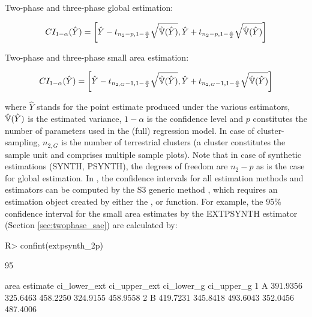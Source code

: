 Two-phase and three-phase global estimation:

\begin{equation}\label{ci_2phase_global}
CI_{1-\alpha}(\hat{Y})=\bigg{\lbrack}\hat{Y}-t_{n_{2}-p, 1-\frac{\alpha}{2}}\sqrt{\hat{\mathbb{V}}(\hat{Y})},
                              \hat{Y}+t_{n_{2}-p, 1-\frac{\alpha}{2}}\sqrt{\hat{\mathbb{V}}(\hat{Y})}\bigg{\rbrack}
\end{equation}

Two-phase and three-phase small area estimation:

\begin{equation}\label{ci_2phase_sae}
CI_{1-\alpha}(\hat{Y})=\bigg{\lbrack}\hat{Y}-t_{n_{2,G}-1, 1-\frac{\alpha}{2}}\sqrt{\hat{\mathbb{V}}(\hat{Y})},
                              \hat{Y}+t_{n_{2,G}-1, 1-\frac{\alpha}{2}}\sqrt{\hat{\mathbb{V}}(\hat{Y})}\bigg{\rbrack}
\end{equation}

\vspace{4mm}

where $\hat{Y}$ stands for the point estimate produced under the various estimators, $\hat{\mathbb{V}}(\hat{Y})$ is the estimated variance, $1-\alpha$ is the confidence level and $p$ constitutes the number of parameters used in the (full) regression model. In case of cluster-sampling, $n_{2,G}$ is the number of terrestrial clusters (a cluster constitutes the sample unit and comprises multiple sample plots). Note that in case of synthetic estimations (SYNTH, PSYNTH), the degrees of freedom are $n_{2}-p$ as is the case for global estimation. In , the confidence intervals for all estimation methods and estimators can be computed by the S3 generic method , which requires an estimation object created by either the ,  or  function. For example, the 95\% confidence interval for the small area estimates by the EXTPSYNTH estimator (Section \ref{sec:twophase_sae}) are calculated by:

\begin{small}
\begin{Schunk}
\begin{Sinput}
R> confint(extpsynth_2p)
\end{Sinput}
\begin{Soutput}
95%
 
  area estimate ci_lower_ext ci_upper_ext ci_lower_g ci_upper_g
1    A 391.9356     325.6463     458.2250   324.9155   458.9558
2    B 419.7231     345.8418     493.6043   352.0456   487.4006
\end{Soutput}
\end{Schunk}
\end{small}


